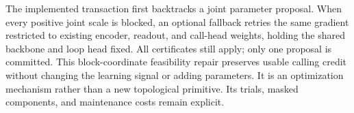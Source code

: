 The implemented transaction first backtracks a joint parameter proposal.
When every positive joint scale is blocked, an optional fallback retries the
same gradient restricted to existing encoder, readout, and call-head weights,
holding the shared backbone and loop head fixed. All certificates still apply;
only one proposal is committed. This block-coordinate feasibility repair
preserves usable calling credit without changing the learning signal or adding
parameters. It is an optimization mechanism rather than a new topological
primitive. Its trials, masked components, and maintenance costs remain explicit.
